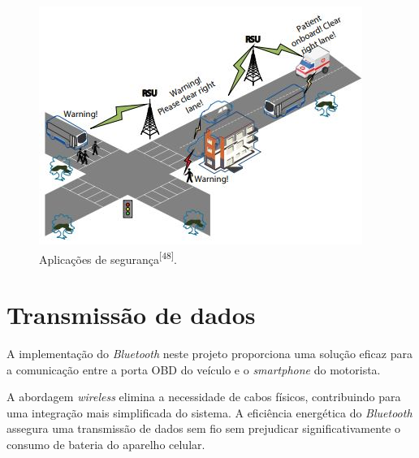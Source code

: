 \begin{figure}[hp]
    \centering
    
    \includegraphics[]{figures/v2x_seguranca.jpg}
    
    \caption{Aplicações de segurança\textsuperscript{[48]}.}
    
    \label{fig:v2x_seguranca}
\end{figure}


\section{Transmissão de dados}

A implementação do \textit{Bluetooth} neste projeto proporciona uma solução eficaz para a comunicação entre a porta OBD do veículo e o \textit{smartphone} do motorista. 


A abordagem \textit{wireless} elimina a necessidade de cabos físicos, contribuindo para uma integração mais simplificada do sistema. A eficiência energética do \textit{Bluetooth} assegura uma transmissão de dados sem fio sem prejudicar significativamente o consumo de bateria do aparelho celular.



